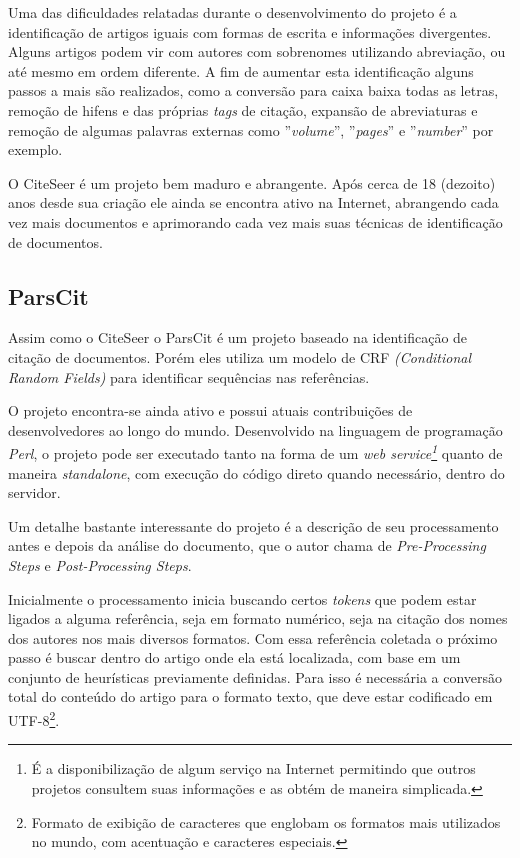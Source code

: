 Uma das dificuldades relatadas durante o desenvolvimento do projeto é a identificação de artigos iguais com formas de escrita e informações divergentes. Alguns artigos podem vir com autores com sobrenomes utilizando abreviação, ou até mesmo em ordem diferente. A fim de aumentar esta identificação alguns passos a mais são realizados, como a conversão para caixa baixa todas as letras, remoção de hifens e das próprias \textit{tags} de citação, expansão de abreviaturas e remoção de algumas palavras externas como ''\textit{volume}'', ''\textit{pages}'' e ''\textit{number}'' por exemplo.

O CiteSeer é um projeto bem maduro e abrangente. Após cerca de 18 (dezoito) anos desde sua criação ele ainda se encontra ativo na Internet, abrangendo cada vez mais documentos e aprimorando cada vez mais suas técnicas de identificação de documentos.

\subsection{ParsCit}
\label{tec-parscit}

Assim como o CiteSeer o ParsCit é um projeto baseado na identificação de citação de documentos. Porém eles utiliza um modelo de CRF \textit{(Conditional Random Fields)} para identificar sequências nas referências. 

O projeto encontra-se ainda ativo e possui atuais contribuições de desenvolvedores ao longo do mundo. Desenvolvido na linguagem de programação \textit{Perl}, o projeto pode ser executado tanto na forma de um \textit{web service\footnote{É a disponibilização de algum serviço na Internet permitindo que outros projetos consultem suas informações e as obtém de maneira simplicada.}} quanto de maneira \textit{standalone}, com execução do código direto quando necessário, dentro do servidor.

Um detalhe bastante interessante do projeto é a descrição de seu processamento antes e depois da análise do documento, que o autor chama de \textit{Pre-Processing Steps} e \textit{Post-Processing Steps}.

Inicialmente o processamento inicia buscando certos \textit{tokens} que podem estar ligados a alguma referência, seja em formato numérico, seja na citação dos nomes dos autores nos mais diversos formatos. Com essa referência coletada o próximo passo é buscar dentro do artigo onde ela está localizada, com base em um conjunto de heurísticas previamente definidas. Para isso é necessária a conversão total do conteúdo do artigo para o formato texto, que deve estar codificado em UTF-8\footnote{Formato de exibição de caracteres que englobam os formatos mais utilizados no mundo, com acentuação e caracteres especiais.}.

